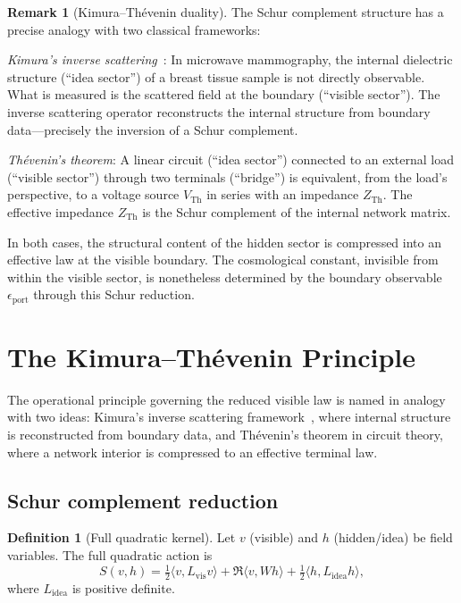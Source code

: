 \documentclass[12pt]{article}
\theoremstyle{plain}
\theoremstyle{definition}
\newtheorem{definition}[theorem]{Definition}
\newtheorem{remark}[theorem]{Remark}
\numberwithin{equation}{section}
\newcommand{\vis}{\mathrm{vis}}
\newcommand{\idea}{\mathrm{idea}}
\begin{document}
\begin{remark}[Kimura--Th\'evenin duality]
The Schur complement structure has a precise analogy with two classical frameworks:

\emph{Kimura's inverse scattering}~\cite{Kimura2020,Kimura2021,Kimura2022}: In microwave mammography, the internal dielectric structure (``idea sector'') of a breast tissue sample is not directly observable.  What is measured is the scattered field at the boundary (``visible sector'').  The inverse scattering operator reconstructs the internal structure from boundary data---precisely the inversion of a Schur complement.

\emph{Th\'evenin's theorem}: A linear circuit (``idea sector'') connected to an external load (``visible sector'') through two terminals (``bridge'') is equivalent, from the load's perspective, to a voltage source $V_{\mathrm{Th}}$ in series with an impedance $Z_{\mathrm{Th}}$.  The effective impedance $Z_{\mathrm{Th}}$ is the Schur complement of the internal network matrix.

In both cases, the structural content of the hidden sector is compressed into an effective law at the visible boundary.  The cosmological constant, invisible from within the visible sector, is nonetheless determined by the boundary observable $\epsilon_{\mathrm{port}}$ through this Schur reduction.
\end{remark}

\section{The Kimura--Th\'evenin Principle}\label{sec:KT}

The operational principle governing the reduced visible law is named in analogy with two ideas: Kimura's inverse scattering framework~\cite{Kimura2020,Kimura2021,Kimura2022}, where internal structure is reconstructed from boundary data, and Th\'evenin's theorem in circuit theory, where a network interior is compressed to an effective terminal law.

\subsection{Schur complement reduction}

\begin{definition}[Full quadratic kernel]
Let $v$ (visible) and $h$ (hidden/idea) be field variables.  The full quadratic action is
\begin{equation}
S(v,h) = \tfrac{1}{2}\langle v, L_{\vis} v\rangle + \Re\langle v, Wh\rangle + \tfrac{1}{2}\langle h, L_{\idea} h\rangle,
\end{equation}
where $L_{\idea}$ is positive definite.
\end{definition}
\end{document}
